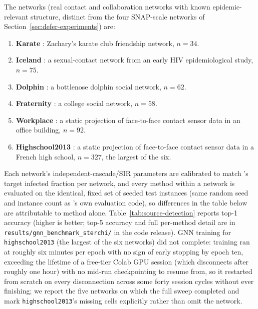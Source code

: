 \documentclass[ijoc,sglanonrev]{informs4}
\begin{document}
\noindent The networks (real contact and collaboration networks with
known epidemic-relevant structure, distinct from the four SNAP-scale
networks of Section~\ref{sec:defer-experiments}) are:

\begin{enumerate}
\item \textbf{Karate} \citep{zachary1977}: Zachary's karate club
  friendship network, $n=34$.
\item \textbf{Iceland} \citep{haraldsdottir1992}: a sexual-contact network
  from an early HIV epidemiological study, $n=75$.
\item \textbf{Dolphin} \citep{lusseau2003}: a bottlenose dolphin social
  network, $n=62$.
\item \textbf{Fraternity} \citep{killworth1976}: a college social network,
  $n=58$.
\item \textbf{Workplace} \citep{genois2015}: a static projection of
  face-to-face contact sensor data in an office building, $n=92$.
\item \textbf{Highschool2013} \citep{mastrandrea2015}: a static projection
  of face-to-face contact sensor data in a French high school, $n=327$,
  the largest of the six.
\end{enumerate}

\noindent Each network's independent-cascade/SIR parameters are calibrated
to match \citet{sterchi2026}'s target infected fraction per network, and
every method within a network is evaluated on the identical, fixed set of
seeded test instances (same random seed and instance count as
\citet{sterchi2026}'s own evaluation code), so differences in the table
below are attributable to method alone. Table~\ref{tab:source-detection}
reports top-1 accuracy (higher is better; top-5 accuracy and full
per-method detail are in \texttt{results/gnn\_benchmark\_sterchi/} in the
code release).
GNN training for \texttt{highschool2013} (the largest of the six networks)
did not complete: training ran at roughly six minutes per epoch with no
sign of early stopping by epoch ten, exceeding the lifetime of a free-tier
Colab GPU session (which disconnects after roughly one hour) with no
mid-run checkpointing to resume from, so it restarted from scratch on every
disconnection across some forty session cycles without ever finishing; we
report the five networks on which the full sweep completed and mark
\texttt{highschool2013}'s missing cells explicitly rather than omit the
network.
\end{document}
